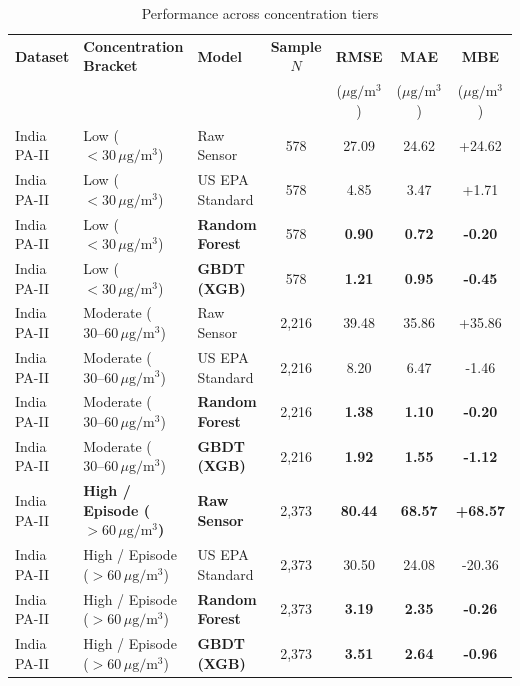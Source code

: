 \documentclass[11pt,a4paper]{article}
\begin{document}
\begin{table}[htbp]
\centering
\small
\caption{Performance across concentration tiers}
\label{tab:conc_strata}
\begin{tabularx}{\textwidth}{l l l c c c c}
\toprule
\textbf{Dataset} & \textbf{Concentration Bracket} & \textbf{Model} & \textbf{Sample $N$} & \textbf{RMSE} & \textbf{MAE} & \textbf{MBE} \\
& & & & ($\mu\text{g}/\text{m}^3$) & ($\mu\text{g}/\text{m}^3$) & ($\mu\text{g}/\text{m}^3$) \\
\midrule
India PA-II & Low ($<30\,\mu\text{g}/\text{m}^3$) & Raw Sensor & 578 & 27.09 & 24.62 & +24.62 \\
India PA-II & Low ($<30\,\mu\text{g}/\text{m}^3$) & US EPA Standard & 578 & 4.85 & 3.47 & +1.71 \\
India PA-II & Low ($<30\,\mu\text{g}/\text{m}^3$) & \textbf{Random Forest} & 578 & \textbf{0.90} & \textbf{0.72} & \textbf{-0.20} \\
India PA-II & Low ($<30\,\mu\text{g}/\text{m}^3$) & \textbf{GBDT (XGB)} & 578 & \textbf{1.21} & \textbf{0.95} & \textbf{-0.45} \\
\midrule
India PA-II & Moderate ($30\text{--}60\,\mu\text{g}/\text{m}^3$) & Raw Sensor & 2,216 & 39.48 & 35.86 & +35.86 \\
India PA-II & Moderate ($30\text{--}60\,\mu\text{g}/\text{m}^3$) & US EPA Standard & 2,216 & 8.20 & 6.47 & -1.46 \\
India PA-II & Moderate ($30\text{--}60\,\mu\text{g}/\text{m}^3$) & \textbf{Random Forest} & 2,216 & \textbf{1.38} & \textbf{1.10} & \textbf{-0.20} \\
India PA-II & Moderate ($30\text{--}60\,\mu\text{g}/\text{m}^3$) & \textbf{GBDT (XGB)} & 2,216 & \textbf{1.92} & \textbf{1.55} & \textbf{-1.12} \\
\midrule
India PA-II & \textbf{High / Episode ($>60\,\mu\text{g}/\text{m}^3$)} & \textbf{Raw Sensor} & 2,373 & \textbf{80.44} & \textbf{68.57} & \textbf{+68.57} \\
India PA-II & High / Episode ($>60\,\mu\text{g}/\text{m}^3$) & US EPA Standard & 2,373 & 30.50 & 24.08 & -20.36 \\
India PA-II & High / Episode ($>60\,\mu\text{g}/\text{m}^3$) & \textbf{Random Forest} & 2,373 & \textbf{3.19} & \textbf{2.35} & \textbf{-0.26} \\
India PA-II & High / Episode ($>60\,\mu\text{g}/\text{m}^3$) & \textbf{GBDT (XGB)} & 2,373 & \textbf{3.51} & \textbf{2.64} & \textbf{-0.96} \\

\end{tabularx}
\end{table}
\end{document}
